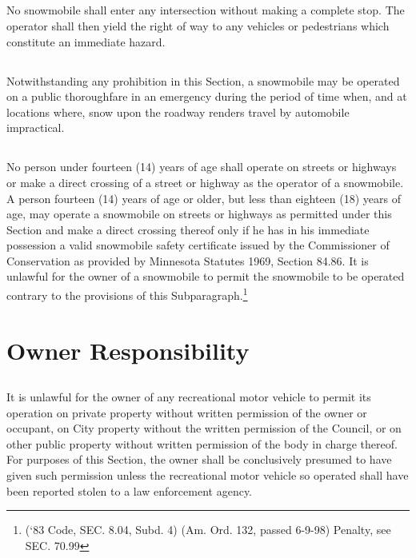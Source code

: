\subsection{}
No snowmobile shall enter any intersection without making a complete stop. The operator shall then yield the right of way to any vehicles or pedestrians which constitute an immediate hazard.
\subsection{}
Notwithstanding any prohibition in this Section, a snowmobile may be operated on a public thoroughfare in an emergency during the period of time when, and at locations where, snow upon the roadway renders travel by automobile impractical.
\subsection{}
No person under fourteen (14) years of age shall operate on streets or highways or make a direct crossing of a street or highway as the operator of a snowmobile. A person fourteen (14) years of age or older, but less than eighteen (18) years of age, may operate a snowmobile on streets or highways as permitted under this Section and make a direct crossing thereof only if he has in his immediate possession a valid snowmobile safety certificate issued by the Commissioner of Conservation as provided by Minnesota Statutes 1969, Section 84.86. It is unlawful for the owner of a snowmobile to permit the snowmobile to be operated contrary to the provisions of this Subparagraph.\footnote{(‘83 Code, SEC. 8.04, Subd. 4) (Am. Ord. 132, passed 6-9-98) Penalty, see SEC. 70.99}

\section{Owner Responsibility}
\subsection{}
It is unlawful for the owner of any recreational motor vehicle to permit its operation on private property without written permission of the owner or occupant, on City property without the written permission of the Council, or on other public property without written permission of the body in charge thereof. For purposes of this Section, the owner shall be conclusively presumed to have given such permission unless the recreational motor vehicle so operated shall have been reported stolen to a law enforcement agency.
